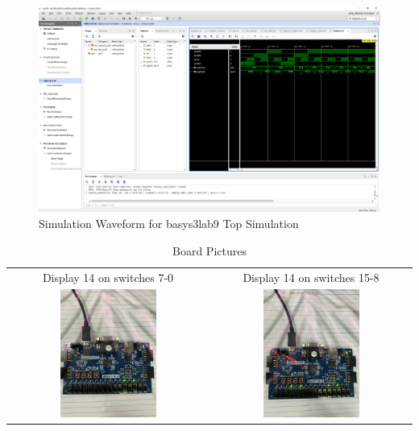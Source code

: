 \documentclass[11pt]{article}
\begin{document}
\begin{figure}[ht]\centering
	\caption{Simulation Waveform for basys3lab9 Top Simulation}
	\includegraphics [width=1\textwidth,trim=640 550 10 135, clip]{toplevel_sim}
\end{figure}

\begin{table}[h]\centering
	\begin{tabular}{cc}
		Display 14 on switches 7-0 & Display 14 on switches 15-8 \\
		\includegraphics [width=0.5\textwidth,trim=0 0 0 0, clip, angle = 270]{step1} &
		\includegraphics [width=0.5\textwidth,trim=0 0 0 0, clip, angle = 270]{step2} \\
	\end{tabular}
	\caption{Board Pictures}
	\label{fig:sim_with_table}
\end{table}
\end{document}

